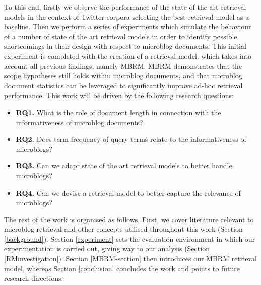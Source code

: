 To this end, firstly we observe the performance of the state of the art retrieval models in the context of Twitter corpora selecting the best retrieval model as a baseline. Then we perform a series of experiments which simulate the behaviour of a number of state of the art retrieval models in order to identify possible shortcomings in their design with respect to microblog documents. This initial experiment is completed with the creation of a retrieval model, which takes into account all previous findings, namely MBRM. MBRM demonstrates that the scope hypotheses still holds within microblog documents, and that microblog document statistics can be leveraged to significantly improve ad-hoc retrieval performance. This work will be driven by the following research questions:

\begin{itemize}
\item[] \textbf{RQ1.} What is the role of document length in connection with the informativeness of microblog documents?
\item[] \textbf{RQ2.} Does term frequency of query terms relate to the informativeness of microblogs? 
\item[] \textbf{RQ3.} Can we adapt state of the art retrieval models to better handle microblogs?
\item[] \textbf{RQ4.} Can we devise a retrieval model to better capture the relevance of microblogs?
\end{itemize}

The rest of the work is organised as follows. First, we cover literature relevant to microblog retrieval and other concepts utilised throughout this work (Section \ref{background}). Section \ref{experiment} sets the evaluation environment in which our experimentation is carried out, giving way to our analysis (Section \ref{RMinvestigation}). Section \ref{MBRM-section} then introduces our MBRM retrieval model, whereas Section \ref{conclusion} concludes the work and points to future research directions.

